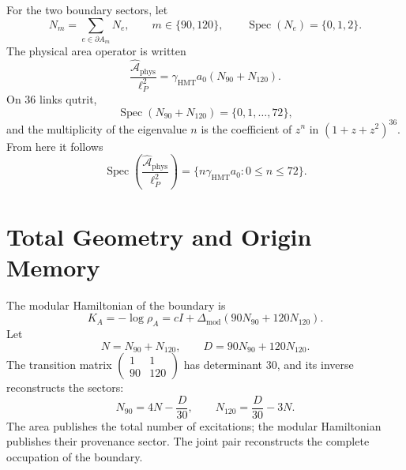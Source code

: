 For the two boundary sectors, let
\begin{equation}
 N_m=\sum_{e\in\partial A_m}N_e,
 \qquad m\in\{90,120\},
 \qquad \operatorname{Spec}(N_e)=\{0,1,2\}.
 \label{eq:l9s102:n90-n120}
\end{equation}
The physical area operator is written
\begin{equation}
 \boxed{
 \frac{\widehat{\mathcal A}_{\mathrm{phys}}}{\ell_P^2}
 =\gamma_{\mathrm{HMT}}a_0(N_{90}+N_{120}).}
 \label{eq:l9s102:area-operador}
\end{equation}
On \(36\) links qutrit,
\begin{equation}
 \operatorname{Spec}(N_{90}+N_{120})=\{0,1,\ldots,72\},
 \label{eq:l9s102:area-numero-spectrum}
\end{equation}
and the multiplicity of the eigenvalue \(n\) is the coefficient of \(z^n\) in
\((1+z+z^2)^{36}\). From here it follows
\begin{equation}
 \operatorname{Spec}\!\left(
 \frac{\widehat{\mathcal A}_{\mathrm{phys}}}{\ell_P^2}\right)
 =\{n\gamma_{\mathrm{HMT}}a_0:0\le n\le72\}.
 \label{eq:l9s102:area-spectrum}
\end{equation}

\section{Total Geometry and Origin Memory}
\label{sec:l9s102:area-hamiltoniano}

The modular Hamiltonian of the boundary is
\begin{equation}
 \boxed{
 K_A=-\log\rho_A
 =cI+\Delta_{\mathrm{mod}}(90N_{90}+120N_{120}).}
 \label{eq:l9s102:hamiltoniano-modular}
\end{equation}
Let
\begin{equation}
 N=N_{90}+N_{120},
 \qquad
 D=90N_{90}+120N_{120}.
 \label{eq:l9s102:n-d}
\end{equation}
The transition matrix
\(\left(\begin{smallmatrix}1&1\\90&120\end{smallmatrix}\right)\)
has determinant \(30\), and its inverse reconstructs the sectors:
\begin{equation}
 \boxed{
 N_{90}=4N-\frac{D}{30},
 \qquad
 N_{120}=\frac{D}{30}-3N.}
 \label{eq:l9s102:reconstruccion-sectores}
\end{equation}
The area publishes the total number of excitations; the modular Hamiltonian
publishes their provenance sector. The joint pair reconstructs the complete
occupation of the boundary.

